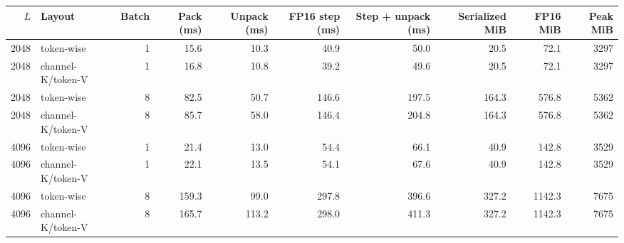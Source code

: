 \scriptsize
\setlength{\tabcolsep}{3.5pt}
\label{tab:t2ccodec}
\begin{adjustbox}{max width=\linewidth}
\begin{tabular}{rlrrrrrrrr}
\toprule
$L$ & Layout & Batch & Pack (ms) & Unpack (ms) & FP16 step (ms) & Step + unpack (ms) & Serialized MiB & FP16 MiB & Peak MiB \\
\midrule
2048 & token-wise & 1 & 15.6 & 10.3 & 40.9 & 50.0 & 20.5 & 72.1 & 3297 \\
2048 & channel-K/token-V & 1 & 16.8 & 10.8 & 39.2 & 49.6 & 20.5 & 72.1 & 3297 \\
2048 & token-wise & 8 & 82.5 & 50.7 & 146.6 & 197.5 & 164.3 & 576.8 & 5362 \\
2048 & channel-K/token-V & 8 & 85.7 & 58.0 & 146.4 & 204.8 & 164.3 & 576.8 & 5362 \\
4096 & token-wise & 1 & 21.4 & 13.0 & 54.4 & 66.1 & 40.9 & 142.8 & 3529 \\
4096 & channel-K/token-V & 1 & 22.1 & 13.5 & 54.1 & 67.6 & 40.9 & 142.8 & 3529 \\
4096 & token-wise & 8 & 159.3 & 99.0 & 297.8 & 396.6 & 327.2 & 1142.3 & 7675 \\
4096 & channel-K/token-V & 8 & 165.7 & 113.2 & 298.0 & 411.3 & 327.2 & 1142.3 & 7675 \\
\bottomrule
\end{tabular}
\end{adjustbox}
